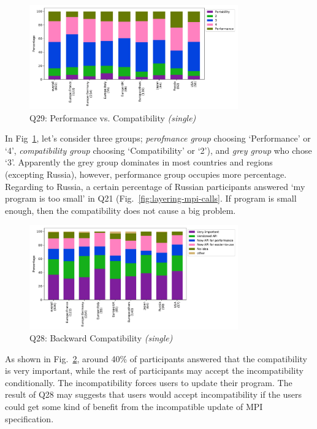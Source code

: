 \documentclass[conference,10pt,letterpaper]{IEEEtran}
\def\myquote#1{`#1'}
\begin{document}
\begin{figure}[htb]
\begin{center}
\includegraphics[width=9cm]{Figs/Q29.pdf}
\caption{Q29: Performance vs. Compatibility {\it(single)}}
\label{fig:performance-vs-compatibility}
\end{center}
\end{figure}

In Fig~\ref{fig:performance-vs-compatibility}, let's consider three
groups; {\it perofmance group} choosing \myquote{Performance} or
\myquote{4}, {\it compatibility group} choosing \myquote{Compatibility} or
\myquote{2}), and {\it grey group} who chose \myquote{3}. Apparently the grey
group dominates in most countries and regions (excepting Russia),
however, performance group occupies more percentage. Regarding to
Russia, a certain percentage of Russian participants answered
\myquote{my program is too small} in Q21
(Fig.~\ref{fig:layering-mpi-calls}. If program is small enough, then
the compatibility does not cause a big problem.

\begin{figure}[htb]
\begin{center}
\includegraphics[width=9cm]{Figs/Q28.pdf}
\caption{Q28: Backward Compatibility {\it(single)}}
\label{fig:compatibility}
\end{center}
\end{figure}

As shown in Fig.~\ref{fig:compatibility}, around 40\% of participants
answered that the compatibility is very important, while the rest of
participants may accept the incompatibility conditionally. The
incompatibility forces users to update their program. The result of
Q28 may suggests that users would accept incompatibility if the users
could get some kind of benefit from the incompatible update of MPI
specification. 
\end{document}
